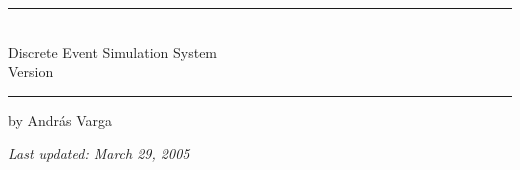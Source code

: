 

\begin{center}\end{center}
\vspace{16em}
\hrule
\vspace{2em}
\begin{center}
\tbf{{\huge {\opp}}}\\
\vspace{1.5em}
{\LARGE Discrete Event Simulation System}\\
\vspace{1em}
{\large Version {\oppversion}}\\
\vspace{1em}
\end{center}
\vspace{2em}
\hrule

\vspace{4em}
by {\large Andr\'{a}s Varga}
\vspace{3em}

\textit{Last updated: March 29, 2005}



